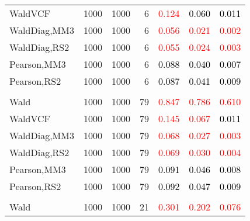 \documentclass[
]{article}
\begin{document}
\begin{table}[H]
{\begin{tabular}[t]{lrrrrrr}
\hspace{1em}WaldVCF & 1000 & 1000 & 6 & \textcolor{red}{0.124} & \textcolor{black}{0.060} & \textcolor{black}{0.011}\\
\hspace{1em}WaldDiag,MM3 & 1000 & 1000 & 6 & \textcolor{red}{0.056} & \textcolor{red}{0.021} & \textcolor{red}{0.002}\\
\hspace{1em}WaldDiag,RS2 & 1000 & 1000 & 6 & \textcolor{red}{0.055} & \textcolor{red}{0.024} & \textcolor{red}{0.003}\\
\hspace{1em}Pearson,MM3 & 1000 & 1000 & 6 & \textcolor{black}{0.088} & \textcolor{black}{0.040} & \textcolor{black}{0.007}\\
\hspace{1em}Pearson,RS2 & 1000 & 1000 & 6 & \textcolor{black}{0.087} & \textcolor{black}{0.041} & \textcolor{black}{0.009}\\
\addlinespace[0.3em]
\multicolumn{7}{l}{\textbf{1F 15V}}\\
\hspace{1em}Wald & 1000 & 1000 & 79 & \textcolor{red}{0.847} & \textcolor{red}{0.786} & \textcolor{red}{0.610}\\
\hspace{1em}WaldVCF & 1000 & 1000 & 79 & \textcolor{red}{0.145} & \textcolor{red}{0.067} & \textcolor{black}{0.011}\\
\hspace{1em}WaldDiag,MM3 & 1000 & 1000 & 79 & \textcolor{red}{0.068} & \textcolor{red}{0.027} & \textcolor{red}{0.003}\\
\hspace{1em}WaldDiag,RS2 & 1000 & 1000 & 79 & \textcolor{red}{0.069} & \textcolor{red}{0.030} & \textcolor{red}{0.004}\\
\hspace{1em}Pearson,MM3 & 1000 & 1000 & 79 & \textcolor{black}{0.091} & \textcolor{black}{0.046} & \textcolor{black}{0.008}\\
\hspace{1em}Pearson,RS2 & 1000 & 1000 & 79 & \textcolor{black}{0.092} & \textcolor{black}{0.047} & \textcolor{black}{0.009}\\
\addlinespace[0.3em]
\multicolumn{7}{l}{\textbf{2F 10V}}\\
\hspace{1em}Wald & 1000 & 1000 & 21 & \textcolor{red}{0.301} & \textcolor{red}{0.202} & \textcolor{red}{0.076}\\

\end{tabular}}
\end{table}
\end{document}
